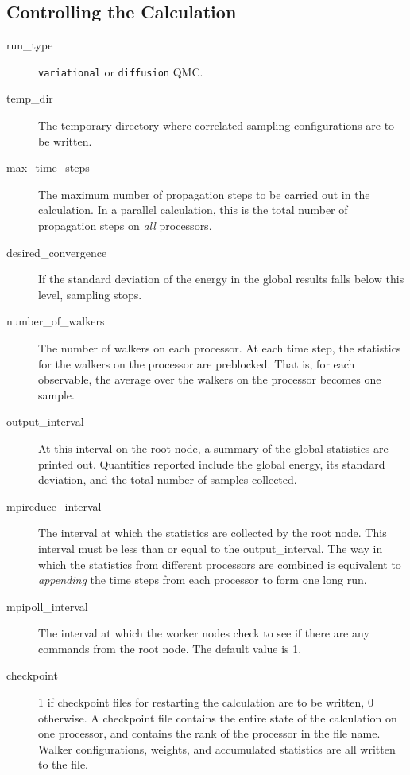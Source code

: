 \documentclass{article}
\begin{document}
\subsection{Controlling the Calculation}

\begin{description}

\item [run\_type] \verb-variational- or \verb-diffusion- QMC.

\item [temp\_dir] The temporary directory where correlated
  sampling configurations are to be written.

\item [max\_time\_steps] The maximum number of propagation steps to be
  carried out in the calculation.  In a parallel calculation, this is
  the total number of propagation steps on \emph{all} processors. 

\item [desired\_convergence] If the standard deviation of the energy in
  the global results falls below this level, sampling stops.  

\item [number\_of\_walkers] The number of walkers on each processor.  At
  each time step, the statistics for the walkers on the processor are
  preblocked.  That is, for each observable, the average over the
  walkers on the processor becomes one sample.   

\item [output\_interval] At this interval on the root node, a summary of
  the global statistics are printed out.  Quantities reported include
  the global energy, its standard deviation, and the total number of
  samples collected. 

\item [mpireduce\_interval] The interval at which the statistics are
  collected by the root node.  This interval must be less than or
  equal to the output\_interval.  The way in which the statistics from
  different processors are combined is equivalent to \emph{appending}
  the time steps from each processor to form one long run.     

\item [mpipoll\_interval] The interval at which the worker nodes
  check to see if there are any commands from the root node.  The
  default value is 1.

\item [checkpoint] 1 if checkpoint files for restarting the calculation
  are to be written, 0 otherwise.  A checkpoint file contains the
  entire state of the calculation on one processor, and contains the
  rank of the processor in the file name.  Walker configurations,
  weights, and accumulated statistics are all written to the file.  


\end{description}
\end{document}
